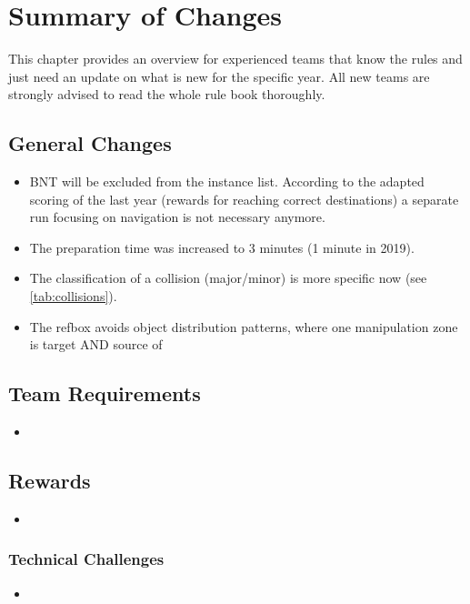 
\chapter{Summary of Changes}

This chapter provides an overview for experienced teams that know the rules and just need an update on what is new for the specific year. All new teams are strongly advised to read the whole rule book thoroughly.

\section{General Changes}
\begin{itemize}
  \item BNT will be excluded from the instance list. According to the adapted scoring of the last year (rewards for reaching correct destinations) a separate run focusing on navigation is not necessary anymore.
  \item The preparation time was increased to 3 minutes (1 minute in 2019).
  \item The classification of a collision (major/minor) is more specific now (see \ref{tab:collisions}).
  \item The refbox avoids object distribution patterns, where one manipulation zone is target AND source of
\end{itemize}

\section{Team Requirements}
\begin{itemize}
  \item
\end{itemize}

\section{Rewards}
\begin{itemize}
  \item
\end{itemize}

\subsection{Technical Challenges}
\begin{itemize}
  \item
\end{itemize}
